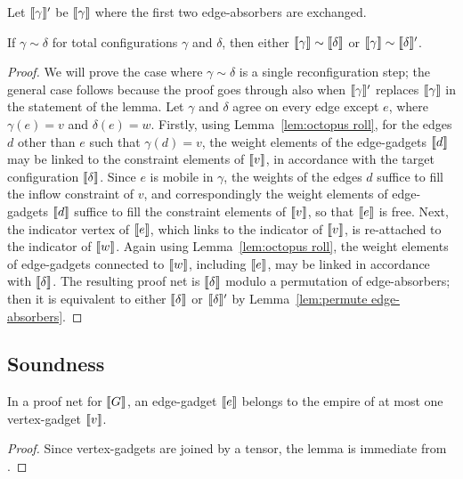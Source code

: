Let $\llbracket\gamma\rrbracket'$ be $\llbracket\gamma\rrbracket$ where the first two edge-absorbers are exchanged.

\begin{lemma}
If $\gamma\sim\delta$ for total configurations $\gamma$ and $\delta$, then either $\llbracket\gamma\rrbracket\sim\llbracket\delta\rrbracket$ or $\llbracket\gamma\rrbracket\sim\llbracket\delta\rrbracket'$.
\end{lemma}

\begin{proof}
We will prove the case where $\gamma\sim\delta$ is a single reconfiguration step; the general case follows because the proof goes through also when $\llbracket\gamma\rrbracket'$ replaces $\llbracket\gamma\rrbracket$ in the statement of the lemma.
%
Let $\gamma$ and $\delta$ agree on every edge except $e$, where $\gamma(e)=v$ and $\delta(e)=w$.
%
Firstly, using Lemma~\ref{lem:octopus roll}, for the edges $d$ other than $e$ such that $\gamma(d)=v$, the weight elements of the edge-gadgets $\llbracket d\rrbracket$ may be linked to the constraint elements of $\llbracket v\rrbracket$, in accordance with the target configuration $\llbracket\delta\rrbracket$.
%
Since $e$ is mobile in $\gamma$, the weights of the edges $d$ suffice to fill the inflow constraint of $v$, and correspondingly the weight elements of edge-gadgets $\llbracket d\rrbracket$ suffice to fill the constraint elements of $\llbracket v\rrbracket$, so that $\llbracket e\rrbracket$ is free.
%
Next, the indicator vertex of $\llbracket e\rrbracket$, which links to the indicator of $\llbracket v\rrbracket$, is re-attached to the indicator of $\llbracket w\rrbracket$.
%
Again using Lemma~\ref{lem:octopus roll}, the weight elements of edge-gadgets connected to $\llbracket w\rrbracket$, including $\llbracket e\rrbracket$, may be linked in accordance with $\llbracket\delta\rrbracket$.
%
The resulting proof net is $\llbracket\delta\rrbracket$ modulo a permutation of edge-absorbers; then it is equivalent to either $\llbracket\delta\rrbracket$ or $\llbracket\delta\rrbracket'$ by Lemma~\ref{lem:permute edge-absorbers}.
\end{proof}



\subsection{Soundness}


\begin{lemma}
In a proof net for $\llbracket G\rrbracket$, an edge-gadget $\llbracket e\rrbracket$ belongs to the empire of at most one vertex-gadget $\llbracket v\rrbracket$.
\end{lemma}

\begin{proof}
Since vertex-gadgets are joined by a tensor, the lemma is immediate from \cite[Proposition 1]{Bellin-vandeWiele-1995}.
\end{proof}




